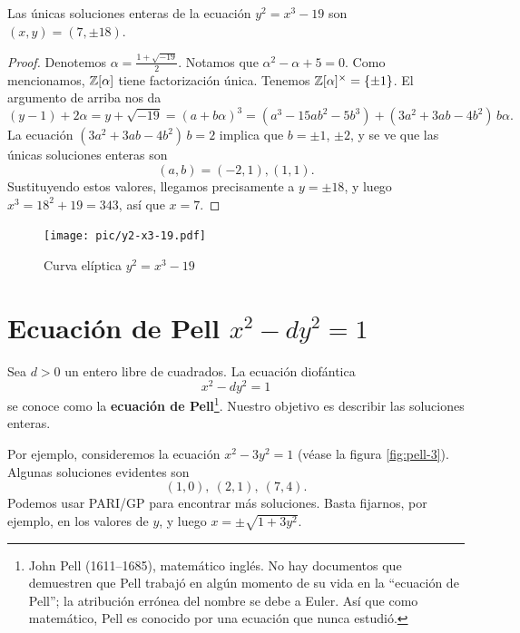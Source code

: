\begin{proposicion}
  Las únicas soluciones enteras de la ecuación $y^2 = x^3 - 19$ son
  $(x,y) = (7, \pm 18)$.

  \begin{proof}
    Denotemos $\alpha = \frac{1+\sqrt{-19}}{2}$. Notamos que
    $\alpha^2 - \alpha + 5 = 0$. Como mencionamos, $\mathbb{Z} [\alpha]$ tiene
    factorización única. Tenemos $\mathbb{Z} [\alpha]^\times = \{ \pm 1 \}$.
    El argumento de arriba nos da
    \[ (y-1) + 2\alpha = y + \sqrt{-19} = \left(a + b\alpha\right)^3
           = (a^3 - 15ab^2 - 5b^3) + (3a^2 + 3ab - 4b^2)\,b \alpha. \]
    La ecuación $(3a^2 + 3ab - 4b^2)\,b = 2$ implica que $b = \pm 1$, $\pm 2$,
    y se ve que las únicas soluciones enteras son
    $$(a,b) = (-2,1), (1,1).$$
    Sustituyendo estos valores, llegamos precisamente a $y = \pm 18$, y luego
    $x^3 = 18^2 + 19 = 343$, así que $x = 7$.
  \end{proof}
\end{proposicion}

\begin{figure}
  \begin{center}
    \texttt{[image: pic/y2-x3-19.pdf]}
  \end{center}

  \caption{Curva elíptica $y^2 = x^3 - 19$}
  \label{fig:y2-x3-19}
\end{figure}


\section{Ecuación de Pell \texorpdfstring{$x^2 - dy^2 = 1$}{x² - dy² = 1}}

Sea $d > 0$ un entero libre de cuadrados. La ecuación diofántica
$$x^2 - dy^2 = 1$$
se conoce como la \textbf{ecuación de Pell}\footnote{John Pell (1611--1685),
  matemático inglés. No hay documentos que demuestren que Pell trabajó en algún
  momento de su vida en la ``ecuación de Pell''; la atribución errónea del
  nombre se debe a Euler. Así que como matemático, Pell es conocido por una
  ecuación que nunca estudió.}.
Nuestro objetivo es describir las soluciones enteras.

Por ejemplo, consideremos la ecuación $x^2 - 3y^2 = 1$ (véase la figura
\ref{fig:pell-3}). Algunas soluciones evidentes son
$$(1, 0), ~ (2, 1), ~ (7, 4).$$
Podemos usar PARI/GP para encontrar más soluciones. Basta fijarnos, por ejemplo,
en los valores de $y$, y luego $x = \pm\sqrt{1 + 3y^2}$.

